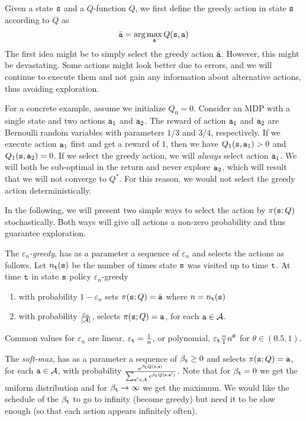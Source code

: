 Given a state ${\tt s}$ and a $Q$-function $Q$, we first define the
greedy action in state ${\tt s}$ according to $Q$ as
\[
\bar{{\tt a}}=\arg\max_{\tt a} Q({\tt s},{\tt a})
\]
The first idea might be to simply select the greedy action  $\bar{{\tt a}}$. However, this might be devastating. Some actions might look better due to errors, and we will continue to execute them and not gain any information about alternative actions, thus avoiding exploration.

For a concrete example, assume we initialize $Q_0 = 0$. Consider an MDP with a single state and two actions ${\tt a}_1$ and ${\tt a}_2$. The reward of action ${\tt a}_1$ and ${\tt a}_2$ are Bernoulli random variables with parameters $1/3$ and $3/4$, respectively. If we execute action ${\tt a}_1$ first and get a reward of $1$, then we have $Q_1({\tt s},{\tt a}_1)>0$ and $Q_1({\tt s},{\tt a}_2)=0$. If we select the greedy action, we will \emph{always} select action ${\tt a}_1$. We will both be sub-optimal in the return and never explore ${\tt a}_2$, which will result that we will not converge to $Q^*$. For this reason, we would not select the greedy action deterministically.

In the following, we will present two simple ways to select the action by $\pi({\tt s};Q)$ stochastically. Both ways will give all actions a non-zero probability and thus guarantee exploration.

The \emph{ $\varepsilon_n$-greedy}, has as a parameter a sequence of
$\varepsilon_n$ and selects the actions as follows. Let
$n_{\tt t}({\tt s})$ be the number of times state ${\tt s}$ was visited
up to time ${\tt t}$. At time ${\tt t}$ in state ${\tt s}$ policy
$\varepsilon_n$-greedy 
\begin{enumerate}
    \item with probability $1-\varepsilon_n$ sets $\pi({\tt s};Q)=\bar{{\tt a}}$ where $n=n_{\tt t}({\tt s})$
    \item with probability $\frac{\varepsilon_n}{|\mathcal{A}|}$, selects $\pi({\tt s};Q)={\tt a}$, for each ${\tt a} \in \mathcal{A}$.
\end{enumerate}
Common values for $\varepsilon_n$ are linear, $\varepsilon_{\tt t}=\frac{1}{n}$, or
polynomial, $\varepsilon_{\tt t}\frac={1}{n^\theta}$ for $\theta\in(0.5,1)$.

The {\em soft-max}, has as a parameter a sequence of
$\beta_{\tt t}\geq 0$ and selects $\pi({\tt s};Q)={\tt a}$, for
each ${\tt a} \in \mathcal{A}$, with probability $\frac{e^{\beta_{\tt t}
Q({\tt s},{\tt a})}}{\sum_{{\tt a}'\in \mathcal{A}}e^{\beta_{\tt t}
Q({\tt s},{\tt a}')}}$. Note that for $\beta_{\tt t}=0$ we get the
uniform distribution and for $\beta_{\tt t}\rightarrow \infty$ we get
the maximum. We would like the schedule of the $\beta_{\tt t}$ to go
to infinity (become greedy) but need it to be slow enough (so that
each action appears infinitely often).

